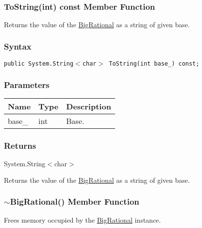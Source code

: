 \documentclass[a4paper,oneside,11.000000pt]{book}
\begin{document}
\hypertarget{System.Numerics.Multiprecision.BigRational.ToString.C.P.System.Numerics.Multiprecision.BigRational.int}{\subsubsection*{ToString(int) const Member Function}}
\begin{flushleft}
Returns the value of the \hyperlink{System.Numerics.Multiprecision.BigRational}{BigRational} as a string of given base.

\end{flushleft}
\subsubsection*{Syntax}
\texttt{public System.String$<$char$>$ ToString(int base\_) const;}
\subsubsection*{Parameters}
\begin{flushleft}
\begin{supertabular}[l]{lll}
\textbf{Name}
& \textbf{Type}
& \textbf{Description}
\\
\hline
base\_
& int
& Base.

\\
\end{supertabular}

\end{flushleft}
\subsubsection*{Returns}System.\-String$<$\-char$>$\-
\begin{flushleft}
Returns the value of the \hyperlink{System.Numerics.Multiprecision.BigRational}{BigRational} as a string of given base.

\end{flushleft}
\clearpage

\hypertarget{System.Numerics.Multiprecision.BigRational.destructor.P.System.Numerics.Multiprecision.BigRational}{\subsubsection*{$\sim$BigRational() Member Function}}
\begin{flushleft}
Frees memory occupied by the \hyperlink{System.Numerics.Multiprecision.BigRational}{BigRational} instance.

\end{flushleft}
\end{document}
